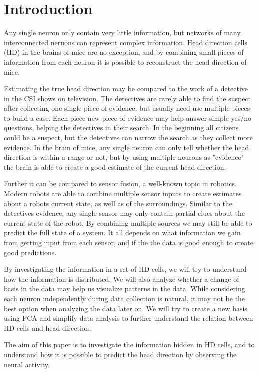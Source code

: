\section{Introduction}
Any single neuron only contain very little information, but networks of many interconnected neruons can represent complex information. Head direction cells (HD) in the brains of mice are no exception, and by combining small pieces of information from each neuron it is possible to reconstruct the head direction of mice.

Estimating the true head direction may be compared to the work of a detective in the CSI shows on television. The detectives are rarely able to find the suspect after collecting one single piece of evidence, but usually need use multiple pieces to build a case. Each piece new piece of evidence may help answer simple yes/no questions, helping the detectives in their search. In the beginning all citizens could be a suspect, but the detectives can narrow the search as they collect more evidence. In the brain of mice, any single neuron can only tell whether the head direction is within a range or not, but by using multiple neurons as "evidence" the brain is able to create a good estimate of the current head direction.  

Further it can be compared to sensor fusion, a well-known topic in robotics. Modern robots are able to combine multiple sensor inputs to create estimates about a robots current state, as well as of the surroundings. Similar to the detectives evidence, any single sensor may only contain partial clues about the current state of the robot. By combining multiple sources we may still be able to predict the full state of a system. It all depends on what information we gain from getting input from each sensor, and if the the data is good enough to create good predictions.

By investigating the information in a set of HD cells, we will try to understand how the information is distributed. 
We will also analyze whether a change of basis in the data may help us visualize patterns in the data. While considering each neuron independently during data collection is natural, it may not be the best option when analyzing the data later on. We will try to create a new basis using PCA and simplify data analysis to further understand the relation between HD cells and head direction.

The aim of this paper is to investigate the information hidden in HD cells, and to understand how it is possible to predict the head direction by observing the neural activity.

